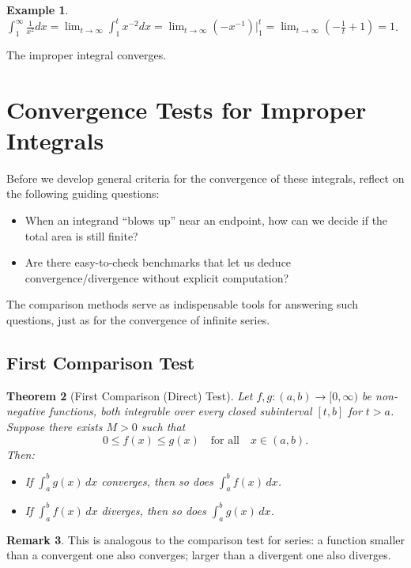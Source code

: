 \documentclass[12pt]{article}
\newtheorem{theorem}{Theorem}[section]
\theoremstyle{definition}
\newtheorem{example}[theorem]{Example}
\newtheorem{remark}[theorem]{Remark}
\begin{document}
\begin{example}
$\int_{1}^{\infty} \frac{1}{x^2} dx = \lim_{t \to \infty} \int_{1}^{t} x^{-2} dx = \lim_{t \to \infty} ( -x^{-1} ) \big|_{1}^{t} = \lim_{t \to \infty} ( -\frac{1}{t} + 1 ) = 1$.

The improper integral converges.
\end{example}

\vspace{0.3cm}

\section{Convergence Tests for Improper Integrals}
Before we develop general criteria for the convergence of these integrals, reflect on the following guiding questions:

\begin{itemize}
    \item When an integrand ``blows up'' near an endpoint, how can we decide if the total area is still finite?
    \item Are there easy-to-check benchmarks that let us deduce convergence/divergence without explicit computation?
\end{itemize}

The comparison methods serve as indispensable tools for answering such questions, just as for the convergence of infinite series.

\subsection{First Comparison Test}

\begin{theorem}[First Comparison (Direct) Test]
Let $f, g : (a, b) \to [0, \infty)$ be non-negative functions, both integrable over every closed subinterval $[t, b]$ for $t > a$. Suppose there exists $M > 0$ such that
\[
0 \leq f(x) \leq g(x) \quad \text{for all} \quad x\in (a, b).
\]
Then:
\begin{itemize}
    \item[(i)] If $\displaystyle \int_a^b g(x)\, dx$ converges, then so does $\displaystyle \int_a^b f(x)\, dx$.
    \item[(ii)] If $\displaystyle \int_a^b f(x)\, dx$ diverges, then so does $\displaystyle \int_a^b g(x)\, dx$.
\end{itemize}
\end{theorem}

\begin{remark}
This is analogous to the comparison test for series: a function smaller than a convergent one also converges; larger than a divergent one also diverges.
\end{remark}
\end{document}
